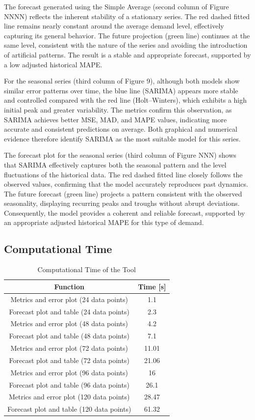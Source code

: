 \documentclass[journal,article,submit,pdftex,moreauthors]{Definitions/mdpi}
\begin{document}
The forecast generated using the Simple Average (second column of Figure NNNN) reflects the inherent stability of a stationary series. The red dashed fitted line remains nearly constant around the average demand level, effectively capturing its general behavior. The future projection (green line) continues at the same level, consistent with the nature of the series and avoiding the introduction of artificial patterns. The result is a stable and appropriate forecast, supported by a low adjusted historical MAPE.

For the seasonal series (third column of Figure 9), although both models show similar error patterns over time, the blue line (SARIMA) appears more stable and controlled compared with the red line (Holt–Winters), which exhibits a high initial peak and greater variability. The metrics confirm this observation, as SARIMA achieves better MSE, MAD, and MAPE values, indicating more accurate and consistent predictions on average. Both graphical and numerical evidence therefore identify SARIMA as the most suitable model for this series.

The forecast plot for the seasonal series (third column of Figure NNN) shows that SARIMA effectively captures both the seasonal pattern and the level fluctuations of the historical data. The red dashed fitted line closely follows the observed values, confirming that the model accurately reproduces past dynamics. The future forecast (green line) projects a pattern consistent with the observed seasonality, displaying recurring peaks and troughs without abrupt deviations. Consequently, the model provides a coherent and reliable forecast, supported by an appropriate adjusted historical MAPE for this type of demand.

\subsection{Computational Time}

\begin{table}[H]
\caption{Computational Time of the Tool}
\centering
\begin{tabularx}{\textwidth}{CC}
\toprule
\textbf{Function} & \textbf{Time [s]} \\
\midrule
Metrics and error plot (24 data points) & 1.1 \\
Forecast plot and table (24 data points) & 2.3 \\
Metrics and error plot (48 data points) & 4.2 \\
Forecast plot and table (48 data points) & 7.1 \\
Metrics and error plot (72 data points) & 11.01 \\
Forecast plot and table (72 data points) & 21.06 \\
Metrics and error plot (96 data points) & 16 \\
Forecast plot and table (96 data points) & 26.1 \\
Metrics and error plot (120 data points) & 28.47 \\
Forecast plot and table (120 data points) & 61.32 \\
\bottomrule
\end{tabularx}
\end{table}
\end{document}
